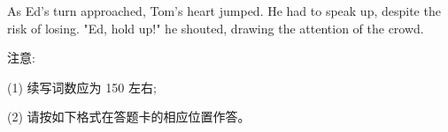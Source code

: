 \documentclass{英语试卷}
\begin{document}
\par As Ed's turn approached, Tom's heart jumped. He had to speak up, despite the risk of losing. "Ed, hold up!" he shouted, drawing the attention of the crowd.\par
\par 注意:\par
\par (1) 续写词数应为 150 左右;\par
\par (2) 请按如下格式在答题卡的相应位置作答。\par
{}
\end{document}
